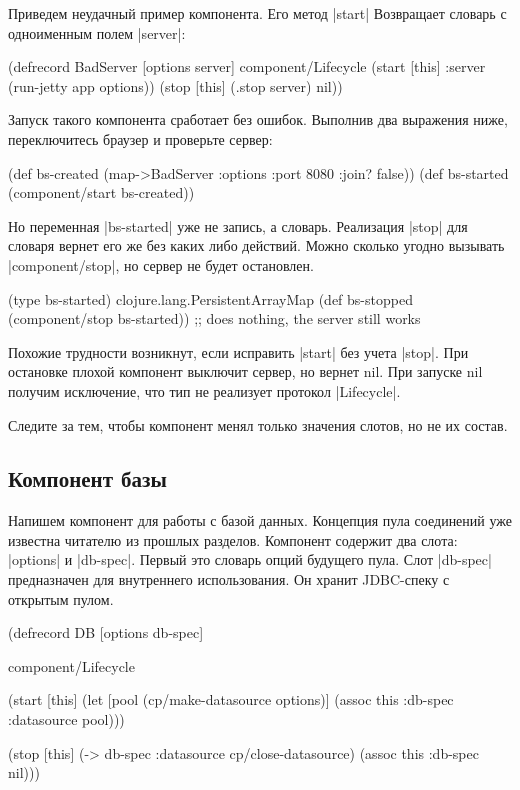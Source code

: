Приведем неудачный пример компонента. Его метод \spverb|start| Возвращает словарь с
одноименным полем \spverb|server|:

\begin{code}
(defrecord BadServer
  [options server]
  component/Lifecycle
  (start [this]
    {:server (run-jetty app options)})
  (stop [this]
    (.stop server)
    nil))
\end{code}

Запуск такого компонента сработает без ошибок. Выполнив два выражения ниже,
переключитесь браузер и проверьте сервер:

\begin{code}
(def bs-created (map->BadServer {:options {:port 8080 :join? false}}))
(def bs-started (component/start bs-created))
\end{code}

Но переменная \spverb|bs-started| уже не запись, а словарь. Реализация \spverb|stop| для
словаря вернет его же без каких либо действий. Можно сколько угодно вызывать
\spverb|component/stop|, но сервер не будет остановлен.

\begin{code}
(type bs-started)
clojure.lang.PersistentArrayMap
(def bs-stopped (component/stop bs-started))
;; does nothing, the server still works
\end{code}

Похожие трудности возникнут, если исправить \spverb|start| без учета \spverb|stop|. При
остановке плохой компонент выключит сервер, но вернет nil. При запуске nil
получим исключение, что тип не реализует протокол \spverb|Lifecycle|.

Следите за тем, чтобы компонент менял только значения слотов, но не их состав.

\subsection{Компонент базы}

Напишем компонент для работы с базой данных. Концепция пула соединений уже
известна читателю из прошлых разделов. Компонент содержит два слота: \spverb|options| и
\spverb|db-spec|. Первый это словарь опций будущего пула. Слот \spverb|db-spec| предназначен
для внутреннего использования. Он хранит JDBC-спеку с открытым пулом.

\begin{code}
(defrecord DB
    [options db-spec]

  component/Lifecycle

  (start [this]
    (let [pool (cp/make-datasource options)]
      (assoc this :db-spec {:datasource pool})))

  (stop [this]
    (-> db-spec :datasource cp/close-datasource)
    (assoc this :db-spec nil)))
\end{code}


